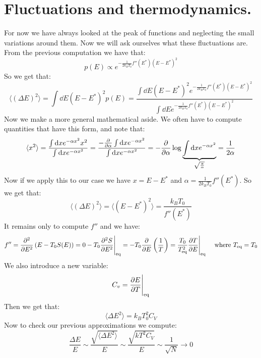 \documentclass[10pt,a4paper]{book}
\begin{document}
\section{Fluctuations and thermodynamics.}
For now we have always looked at the peak of functions and neglecting the small variations around them. Now we will ask ourselves what these fluctuations are. From the previous computation we have that:
\[
p(E) \propto e^{- \frac{1}{2k_B T_0} f''(E^*)(E - E^*)^2}
\]
So we get that:
\[
\langle (\Delta E)^2 \rangle = \int \dd E (E - E^*)^2 p(E) = \frac{\int \dd E (E - E^*)^2 e^{- \frac{1}{2k_B T_0} f''(E^*)(E - E^*)^2} }{\int \dd E e^{- \frac{1}{2k_B T_0} f''(E^*)(E - E^*)^2}}
\]
Now we make a more general mathematical aside. We often have to compute quantities that have this form, and note that:
\[
\langle x^2 \rangle = \frac{\int \dd x e^{-\alpha x^2} x^2}{\int \dd x e^{-\alpha x^2}} = \frac{-\pdv{}{\alpha} \int \dd x e^{-\alpha x^2}}{\int \dd x e^{-\alpha x^2}} = -\pdv{}{\alpha} \log \underbrace{\int \dd x e^{-\alpha x^2}}_{\sqrt{\frac{\pi}{\alpha}}} = \frac{1}{2 \alpha}
\]
Now if we apply this to our case we have $x = E - E^*$ and $\alpha = \frac{1}{2k_B T_0}f''(E^*)$. So we get that:
\[
\langle (\Delta E)^2 \rangle = \langle (E - E^*)^2 \rangle = \frac{k_B T_0}{f''(E^*)}
\]
It remains only to compute $f''$ and we have:
\[
f'' = \pdv[2]{}{E} \left(E - T_0 S(E)\right) = 0 - T_0 \pdv[2]{S}{E}\Bigg|_\text{eq} = - T_0 \pdv{}{E} \left(\frac{1}{T}\right) = \frac{T_0}{T_\text{eq}^2} \pdv{T}{E}\Bigg|_{\text{eq}} \quad \text{ where } T_\text{eq} = T_0
\]
We also introduce a new variable:
\[
C_v = \pdv{E}{T}\Bigg|_{\text{eq}}
\]
Then we get that:
\[
\langle \Delta E^2 \rangle = k_B T_0^2 C_V
\]
Now to check our previous approximations we compute:
\[
\frac{\Delta E}{E} \sim \frac{\sqrt{\langle \Delta E^2 \rangle}}{E} \sim \frac{\sqrt{kT^2 C_V}}{E} \sim \frac{1}{\sqrt{N}} \rightarrow 0 
\]
\end{document}
